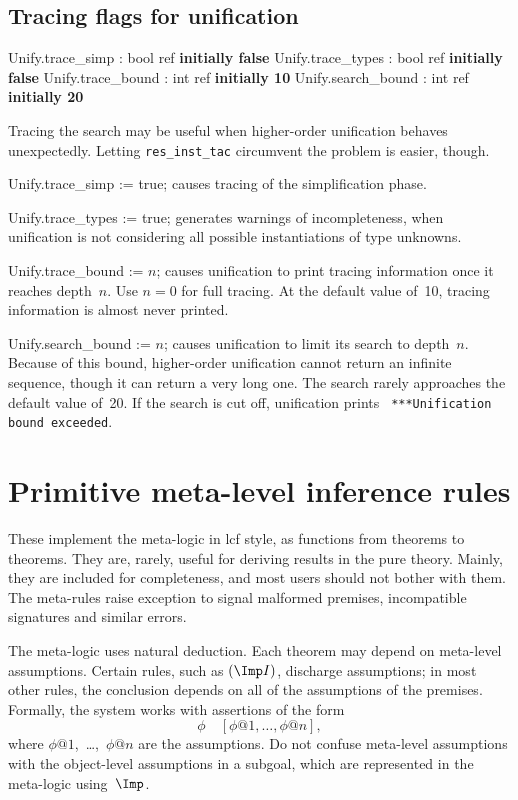 \subsection{Tracing flags for unification}
\begin{ttbox} 
Unify.trace_simp   : bool ref \hfill{\bf initially false}
Unify.trace_types  : bool ref \hfill{\bf initially false}
Unify.trace_bound  : int ref \hfill{\bf initially 10}
Unify.search_bound : int ref \hfill{\bf initially 20}
\end{ttbox}
Tracing the search may be useful when higher-order unification behaves
unexpectedly.  Letting {\tt res_inst_tac} circumvent the problem is easier,
though.
\begin{ttdescription}
\item[Unify.trace_simp := true;] 
causes tracing of the simplification phase.

\item[Unify.trace_types := true;] 
generates warnings of incompleteness, when unification is not considering
all possible instantiations of type unknowns.

\item[Unify.trace_bound := $n$;] 
causes unification to print tracing information once it reaches depth~$n$.
Use $n=0$ for full tracing.  At the default value of~10, tracing
information is almost never printed.

\item[Unify.search_bound := $n$;] 
causes unification to limit its search to depth~$n$.  Because of this
bound, higher-order unification cannot return an infinite sequence, though
it can return a very long one.  The search rarely approaches the default
value of~20.  If the search is cut off, unification prints {\tt
***Unification bound exceeded}.
\end{ttdescription}


\section{Primitive meta-level inference rules}
These implement the meta-logic in {\sc lcf} style, as functions from theorems
to theorems.  They are, rarely, useful for deriving results in the pure
theory.  Mainly, they are included for completeness, and most users should
not bother with them.  The meta-rules raise exception  to signal
malformed premises, incompatible signatures and similar errors.

The meta-logic uses natural deduction.  Each theorem may depend on
meta-level assumptions.  Certain rules, such as $({\Imp}I)$,
discharge assumptions; in most other rules, the conclusion depends on all
of the assumptions of the premises.  Formally, the system works with
assertions of the form
\[ \phi \quad [\phi@1,\ldots,\phi@n], \]
where $\phi@1$,~\ldots,~$\phi@n$ are the assumptions.  Do not confuse
meta-level assumptions with the object-level assumptions in a subgoal,
which are represented in the meta-logic using~$\Imp$.

